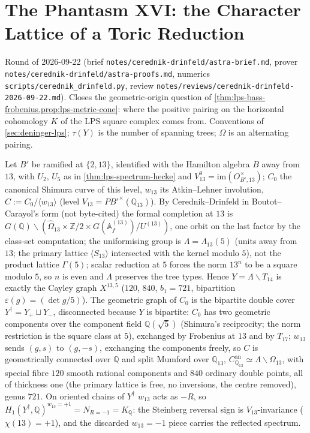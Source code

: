 \section{The Phantasm XVI: the Character Lattice of a Toric Reduction}
\label{sec:cerednik-drinfeld}

Round of 2026-09-22 (brief \texttt{notes/cerednik-drinfeld/astra-brief.md}, prover \texttt{notes/cerednik-drinfeld/astra-proofs.md},
numerics \texttt{scripts/cerednik\_drinfeld.py}, review \texttt{notes/reviews/cerednik-drinfeld-2026-09-22.md}). Closes the
geometric-origin question of \cref{thm:lps-bass-frobenius,prop:lps-metric-cone}: where the positive pairing on the horizontal
cohomology $K$ of the LPS square complex comes from. Conventions of \cref{sec:deninger-lps}; $\tau(Y)$ is the number of spanning
trees; $\Omega$ is an alternating pairing. %

\begin{theorem}
\label{thm:shimura-curve-quotient-dual-graph}
Let $B'$ be ramified at $\{2,13\}$, identified with the Hamilton algebra $B$ away from $13$, with $U_2$, $U_5$ as in
\cref{thm:lps-spectrum-hecke} and $V^0_{13} = \mathrm{im}(O^\times_{B',13})$; $C_0$ the canonical Shimura curve of this level, $w_{13}$ its
Atkin--Lehner involution, $C := C_0/\langle w_{13}\rangle$ (level $V_{13} = PB'^\times(\mathbb Q_{13})$). By Cerednik--Drinfeld in Boutot--Carayol's form
(not byte-cited) the formal completion at $13$ is $G(\mathbb Q)\backslash(\hat\Omega_{13}\times\mathbb Z/2\times G(\mathbb A^{(13)}_f)/U^{(13)})$, one orbit on the last %
factor by the class-set computation; the uniformising group is $\Lambda = \Lambda_{13}(5)$ (units away from $13$; the primary lattice
$\langle S_{13}\rangle$ intersected with the kernel modulo $5$), not the product lattice $\Gamma(5)$; scalar reduction at $5$ forces the norm
$13^n$ to be a square modulo $5$, so $n$ is even and $\Lambda$ preserves the tree types. Hence $Y = \Lambda\backslash T_{14}$ is exactly the Cayley
graph $X^{13,5}$ ($120$, $840$, $b_1 = 721$, bipartition $\varepsilon(g) = (\det g/5)$). The geometric graph of $C_0$ is the bipartite double cover
$Y^\dagger = Y_+\sqcup Y_-$, disconnected because $Y$ is bipartite: $C_0$ has two geometric components over the component field
$\mathbb Q(\sqrt5)$ (Shimura's reciprocity; the norm restriction is the square class at $5$), exchanged by Frobenius at $13$ and by
$T_{17}$; $w_{13}$ sends $(g,s)$ to $(g,-s)$, exchanging the components freely, so $C$ is geometrically connected over $\mathbb Q$ and
split Mumford over $\mathbb Q_{13}$, $C^{\mathrm{an}}_{\mathbb Q_{13}}\simeq\Lambda\backslash\Omega_{13}$, with special fibre $120$ smooth rational %
components and $840$ ordinary double points, all of thickness one (the primary lattice is free, no inversions, the centre
removed), genus $721$. On oriented chains of $Y^\dagger$ $w_{13}$ acts as $-R$, so $H_1(Y^\dagger,\mathbb Q)^{w_{13} = +1} = N_{R = -1} = K_{\mathbb Q}$: the
Steinberg reversal sign is $V_{13}$-invariance ($\chi(13) = +1$), and the discarded $w_{13} = -1$ piece carries the reflected spectrum.
\end{theorem}


